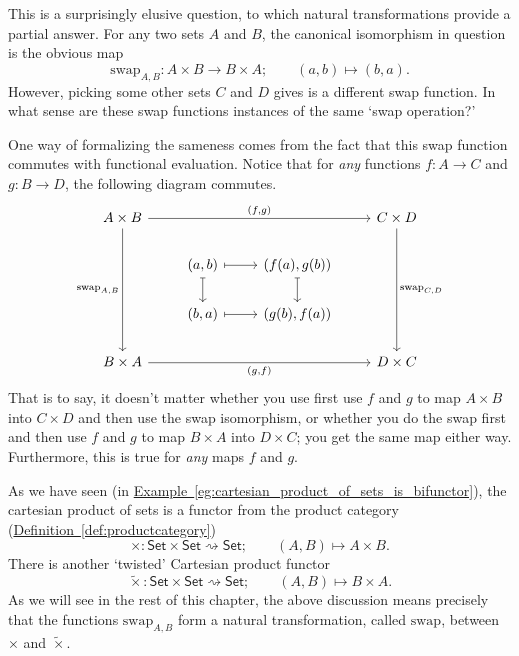 \documentclass[main.tex]{subfiles}
\begin{document}
This is a surprisingly elusive question, to which natural transformations provide a partial answer. For any two sets $A$ and $B$, the canonical isomorphism in question is the obvious map
\begin{equation*}
  \mathrm{swap}_{A,B}\colon A \times B \to B \times A; \qquad (a, b) \mapsto (b, a).
\end{equation*}
However, picking some other sets $C$ and $D$ gives is a different swap function. In what sense are these swap functions instances of the same `swap operation?'

One way of formalizing the sameness comes from the fact that this swap function commutes with functional evaluation. Notice that for \emph{any} functions $f\colon A \to C$ and $g\colon B \to D$, the following diagram commutes.
\begin{equation*}
  \begin{tikzcd}
    A \times B
    \arrow[rrr, "{(f, g)}"]
    \arrow[ddd, swap, "{\mathrm{swap}_{A, B}}"]
    &&& C \times D
    \arrow[ddd, "{\mathrm{swap}_{C, D}}"]
    \\
    & (a, b)
    \arrow[r, mapsto]
    \arrow[d, mapsto]
    & (f(a), g(b))
    \arrow[d, mapsto]
    \\
    & (b, a)
    \arrow[r, mapsto]
    & (g(b), f(a))
    \\
    B \times A
    \arrow[rrr, swap, "{(g, f)}"]
    &&& D \times C
  \end{tikzcd}
\end{equation*}
That is to say, it doesn't matter whether you use first use $f$ and $g$ to map $A \times B$ into $C \times D$ and then use the swap isomorphism, or whether you do the swap first and then use $f$ and $g$ to map $B \times A$ into $D \times C$; you get the same map either way. Furthermore, this is true for \emph{any} maps $f$ and $g$.

As we have seen (in \hyperref[eg:cartesian_product_of_sets_is_bifunctor]{Example~\ref*{eg:cartesian_product_of_sets_is_bifunctor}}), the cartesian product of sets is a functor from the product category (\hyperref[def:productcategory]{Definition~\ref*{def:productcategory}})
\begin{equation*}
  \times\colon \mathsf{Set} \times \mathsf{Set} \rightsquigarrow \mathsf{Set};\qquad (A, B) \mapsto A \times B.
\end{equation*}
There is another `twisted' Cartesian product functor
\begin{equation*}
  \tilde{\times}\colon \mathsf{Set} \times \mathsf{Set} \rightsquigarrow \mathsf{Set};\qquad (A, B) \mapsto B \times A.
\end{equation*}
As we will see in the rest of this chapter, the above discussion means precisely that the functions $\mathrm{swap}_{A,B}$ form a natural transformation, called $\mathrm{swap}$, between $\times$ and $\tilde{\times}$.
\end{document}
